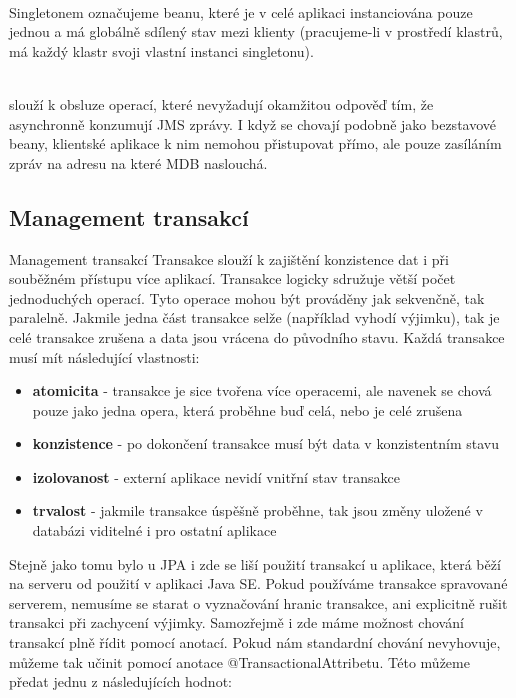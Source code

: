 \documentclass[122pt,oneside]{fithesis}
\begin{document}
\vspace{5 mm}
\\\indent Singletonem označujeme beanu, které je v celé aplikaci instanciována pouze jednou a má globálně sdílený stav mezi klienty (pracujeme-li v prostředí klastrů, má každý klastr svoji vlastní instanci singletonu).

\vspace{5 mm}
\\\indent slouží k obsluze operací, které nevyžadují okamžitou odpověď tím, že asynchronně konzumují JMS zprávy. I když se chovají podobně jako bezstavové beany, klientské aplikace k nim nemohou přistupovat přímo, ale pouze zasíláním zpráv na adresu na které MDB naslouchá.


\subsection{Management transakcí}

Management transakcí
Transakce slouží k zajištění konzistence dat i při souběžném přístupu více aplikací. Transakce logicky sdružuje větší počet jednoduchých operací. Tyto operace mohou být prováděny jak sekvenčně, tak paralelně. Jakmile jedna část transakce selže (například vyhodí výjimku), tak je celé transakce zrušena a data jsou vrácena do původního stavu. Každá transakce musí mít následující vlastnosti:

\begin{itemize}
	  \item {\bf atomicita} - transakce je sice tvořena více operacemi, ale navenek se chová pouze jako jedna opera, která proběhne buď celá, nebo je celé zrušena
  \item {\bf konzistence} - po dokončení transakce musí být data v konzistentním stavu
  \item {\bf izolovanost} - externí aplikace nevidí vnitřní stav transakce
  \item {\bf trvalost} - jakmile transakce úspěšně proběhne, tak jsou změny uložené v databázi viditelné i pro ostatní aplikace
\end{itemize}

Stejně jako tomu bylo u JPA i zde se liší použití transakcí u aplikace, která běží na serveru od použití v aplikaci Java SE. Pokud používáme transakce spravované serverem, nemusíme se starat o vyznačování hranic transakce, ani explicitně rušit transakci při zachycení výjimky. Samozřejmě i zde máme možnost chování transakcí plně řídit pomocí anotací. Pokud nám standardní chování nevyhovuje, můžeme tak učinit pomocí anotace @TransactionalAttribetu. Této můžeme předat jednu z následujících hodnot:
\end{document}
